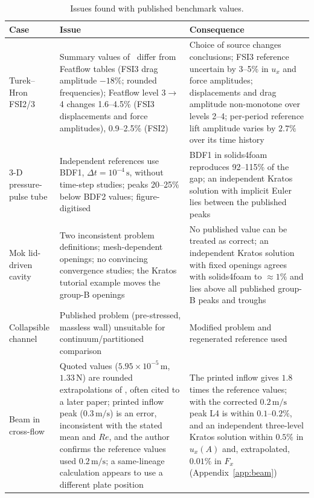 \begin{table}[htbp]
	\centering
	\footnotesize
	\setlength{\tabcolsep}{3pt}
	\caption{Issues found with published benchmark values.}
	\label{tab:published}
	\begin{tabular}{p{2.8cm}p{5.8cm}p{5.0cm}}
		\toprule
		Case & Issue & Consequence \\
		\midrule
		Turek--Hron FSI2/3 & Summary values of~\citet{Turek2006} differ from Featflow tables (FSI3 drag amplitude $-18\%$; rounded frequencies); Featflow level 3$\to$4 changes 1.6--4.5\% (FSI3 displacements and force amplitudes), 0.9--2.5\% (FSI2) & Choice of source changes conclusions; FSI3 reference uncertain by 3--5\% in $u_x$ and force amplitudes; displacements and drag amplitude non-monotone over levels 2--4; per-period reference lift amplitude varies by $2.7\%$ over its time history \\
		3-D pressure-pulse tube & Independent references use BDF1, $\Delta t = 10^{-4}\,\mathrm{s}$, without time-step studies; peaks 20--25\% below BDF2 values; figure-digitised & BDF1 in solids4foam reproduces 92--115\% of the gap; an independent Kratos solution with implicit Euler lies between the published peaks \\
		Mok lid-driven cavity & Two inconsistent problem definitions; mesh-dependent openings; no convincing convergence studies; the Kratos tutorial example moves the group-B openings & No published value can be treated as correct; an independent Kratos solution with fixed openings agrees with solids4foam to $\approx1\%$ and lies above all published group-B peaks and troughs \\
		Collapsible channel & Published problem (pre-stressed, massless wall) unsuitable for continuum/partitioned comparison & Modified problem and regenerated reference used \\
		Beam in cross-flow & Quoted values ($5.95\times10^{-5}\,\mathrm{m}$, $1.33\,\mathrm{N}$) are rounded extrapolations of \citet{Richter2012}, often cited to a later paper; printed inflow peak ($0.3\,\mathrm{m/s}$) is an error, inconsistent with the stated mean and $Re$, and the author confirms the reference values used $0.2\,\mathrm{m/s}$; a same-lineage calculation appears to use a different plate position & The printed inflow gives $1.8$ times the reference values; with the corrected $0.2\,\mathrm{m/s}$ peak L4 is within $0.1$--$0.2\%$, and an independent three-level Kratos solution within $0.5\%$ in $u_x(A)$ and, extrapolated, $0.01\%$ in $F_x$ (Appendix~\ref{app:beam}) \\

\end{tabular}
\end{table}
